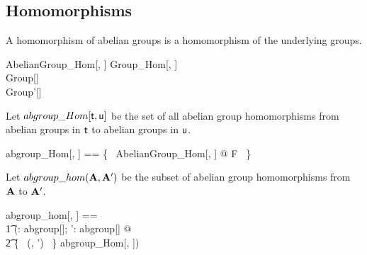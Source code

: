 \documentclass{amsart}
\begin{document}
\subsection{Homomorphisms}

A homomorphism of abelian groups is a homomorphism of the underlying groups.

\begin{schema}{AbelianGroup\_Hom}[\genT, \genU]
	Group\_Hom[\genT, \genU] \\
	Group[\genT] \\
	Group'[\genU]
\end{schema}

Let $abgroup\_Hom[\mathsf{t}, \mathsf{u}]$ be the set of all abelian group homomorphisms
from abelian groups in $\mathsf{t}$ to abelian groups in $\mathsf{u}$.

\begin{zed}
	abgroup\_Hom[\genT, \genU] == \{~ AbelianGroup\_Hom[\genT, \genU] @ F ~\}
\end{zed}

Let $abgroup\_hom(\mathbf{A}, \mathbf{A}')$ be the subset of abelian group homomorphisms
from $\mathbf{A}$ to $\mathbf{A}'$.

\begin{zed}
	abgroup\_hom[\genT, \genU] == \\
	\t1	(\lambda \strucA: abgroup[\genT]; \strucA': abgroup[\genU] @ \\
	\t2		\{~ (\strucA, \strucA') ~\} \dres abgroup\_Hom[\genT, \genU])
\end{zed}

\printbibliography
\end{document}
